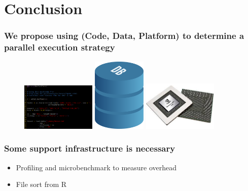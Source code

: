 \documentclass{beamer}
\begin{document}
\section{Conclusion}
\begin{frame}

%
%
%

    \frametitle{We propose using (Code, Data, Platform) to determine a
    parallel execution strategy}

\begin{figure}
            \includegraphics[width=1.4in]{code_screen.png}
            \hfill
            \includegraphics[width=1in]{database.png}
            \hfill
            \includegraphics[width=1.4in]{gpu.jpg}
\end{figure}

\end{frame}
\begin{frame}

    \frametitle{Some support infrastructure is necessary}

\begin{itemize}
\item Profiling and microbenchmark to measure overhead
\item File sort from R
\end{itemize}

\end{frame}
\end{document}
